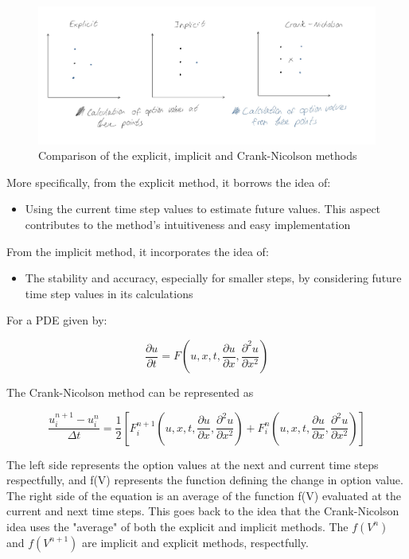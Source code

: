 \documentclass[11pt]{article}
\begin{document}
\begin{figure}[H]
    \centering
    \includegraphics[width=1\linewidth]{Crank-Nicholson-GR.jpg}
    \caption{Comparison of the explicit, implicit and Crank-Nicolson methods}
    \label{}
\end{figure}

More specifically, from the explicit method, it borrows the idea of:

\begin{itemize}

\item Using the current time step values to estimate future values. This aspect contributes to the method's intuitiveness and easy implementation
\end{itemize}
From the implicit method, it incorporates the idea of:
\begin{itemize}
\item The stability and accuracy, especially for smaller steps, by considering future time step values in its calculations
\end{itemize}

For a PDE given by:

\begin{equation}
\frac{\partial u}{\partial t} = F \left( u, x, t, \frac{\partial u}{\partial x}, \frac{\partial^{2}u}{\partial x^{2}} \right)
\end{equation}

The Crank-Nicolson method can be represented as 

\begin{equation}
\frac{u_{i}^{n+1} - u_{i}^{n}}{\Delta t} = \frac{1}{2} \left[ F_{i}^{n+1} \left( u, x, t, \frac{\partial u}{\partial x}, \frac{\partial^{2}u}{\partial x^{2}} \right) + F_{i}^{n} \left( u, x, t, \frac{\partial u}{\partial x}, \frac{\partial^{2}u}{\partial x^{2}} \right) \right]
\end{equation}


The left side represents the option values at the next and current time steps respectfully, and f(V) represents the function defining the change in option value. The right side of the equation is an average of the function f(V) evaluated at the current and next time steps. This goes back to the idea that the Crank-Nicolson idea uses the "average" of both the explicit and implicit methods. The \( f(V^n) \) and \( f(V^{n+1}) \) are implicit and explicit methods, respectfully.
\end{document}
